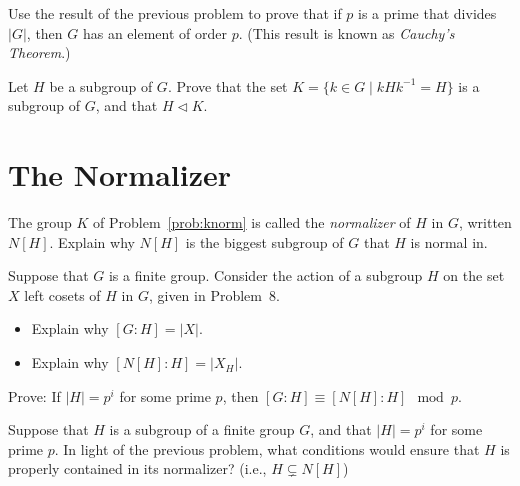 \begin{problem}
Use the result of the previous problem to prove that if $p$ is a prime that divides $\lvert G \rvert$, then $G$ has an element of order $p$. (This result is known as \emph{Cauchy's Theorem}.)
\end{problem}




\begin{problem}\label{prob:knorm}
Let $H$ be a subgroup of $G$.  Prove that the set $K = \{ k \in G \mid kHk^{-1} = H\}$ is a subgroup of $G$, and that $H \lhd K$.
\end{problem}



\section{The Normalizer}

\begin{problem}
The group $K$ of Problem~\ref{prob:knorm} is called the \emph{normalizer} of $H$ in $G$, written $N[H]$.  Explain why $N[H]$ is the biggest subgroup of $G$ that $H$ is normal in.
\end{problem}



\begin{problem}
Suppose that $G$ is a finite group. Consider the action of a subgroup $H$ on the set $X$ left cosets of $H$ in $G$, given in Problem~8.
\begin{itemize}
 \item Explain why $[G:H] = \lvert X \rvert$.
 \item Explain why $[N[H]:H] = \lvert X_H \rvert$.
\end{itemize}
\end{problem}



\begin{problem}
Prove: If $\lvert H \rvert = p^i$ for some prime $p$, then $[G:H] \equiv [N[H]:H] \mod p$.
\end{problem}



\begin{problem}
Suppose that $H$ is a subgroup of a finite group $G$, and that $\lvert H \rvert = p^i$ for some prime $p$. In light of the previous problem, what conditions would ensure that $H$ is properly contained in its normalizer? (i.e., $H \subsetneq N[H]$)
\end{problem}



